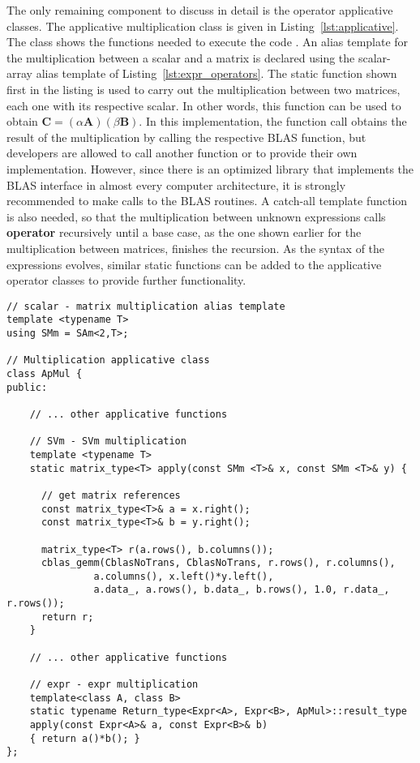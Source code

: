 \documentclass[11pt]{article}
\newcommand{\code}[1]{{\footnotesize\ttfamily{#1}}}
\newcommand\keywordd[1]{{\color{DarkOrchid}\footnotesize\ttfamily\textbf{#1}}}
\begin{document}
The only remaining component to discuss in detail is the operator applicative classes. The applicative multiplication class \code{ApMul} is given in Listing~\ref{lst:applicative}.
The class shows the functions needed to execute the code \code{matrix\_type$<$double$>$}\code{ C = alpha*A*B}. An alias template for the multiplication between a scalar and a matrix is declared using the scalar-array alias template of Listing~\ref{lst:expr_operators}.
The static function shown first in the listing is used to carry out the multiplication between two matrices, each one with its respective scalar. In other words, this function can be used to obtain $\mathbf{C} = \left( \alpha \mathbf{A} \right) \left( \beta \mathbf{B} \right)$. In this implementation, the function call obtains the result of the multiplication by calling the respective BLAS function, but developers are allowed to call another function or to provide their own implementation.
However, since there is an optimized library that implements the BLAS interface in almost every computer architecture, it is strongly recommended to make calls to the BLAS routines.
A catch-all template function is also needed, so that the multiplication between unknown expressions calls \keywordd{operator}\code{()} recursively until a base case, as the one shown earlier for the multiplication between matrices, finishes the recursion.
As the syntax of the expressions evolves, similar static functions can be added to the applicative operator classes to provide further functionality.
\begin{lstlisting}[caption={\code{ApMul} multiplication applicative class}, label=lst:applicative]
// scalar - matrix multiplication alias template
template <typename T>
using SMm = SAm<2,T>;

// Multiplication applicative class
class ApMul {
public:
    
    // ... other applicative functions
    
    // SVm - SVm multiplication
    template <typename T>
    static matrix_type<T> apply(const SMm <T>& x, const SMm <T>& y) {
    
      // get matrix references
      const matrix_type<T>& a = x.right();
      const matrix_type<T>& b = y.right();
      
      matrix_type<T> r(a.rows(), b.columns());
      cblas_gemm(CblasNoTrans, CblasNoTrans, r.rows(), r.columns(),
               a.columns(), x.left()*y.left(),
               a.data_, a.rows(), b.data_, b.rows(), 1.0, r.data_, r.rows());
      return r;
    }
    
    // ... other applicative functions

    // expr - expr multiplication
    template<class A, class B>
    static typename Return_type<Expr<A>, Expr<B>, ApMul>::result_type
    apply(const Expr<A>& a, const Expr<B>& b)
    { return a()*b(); }
};
\end{lstlisting}
\end{document}
